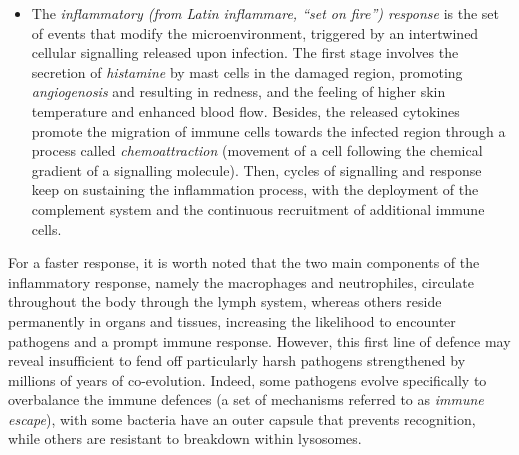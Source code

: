 \begin{itemize}
    Interferons interfere with  cells hosting virus, through mechanisms depending on their belonging class: $\alpha$, $\beta$ and $\gamma$. Interferons are released by virus-infected cells and by binding to neighbouring immune cells, they inhibit viral replication or promote the phagocytic ability of macrophages.

    Cytokines can be released by macrophages, dendritic cells, and natural killer cells. While some of them, such as interleukin-1 (IL-1) and tumour necrosis factor alpha (TNF-alpha), promote inflammation by recruiting neutrophils to the site of infection, others, on the contrary, such as interleukin-10 (IL-10) and transforming growth factor beta (TGF-beta) resolve inflammation and promote tissue repair.  
    
    \item The \textit{inflammatory (from Latin \textit{inflammare}, \enquote{set on fire}) response} is the set of events that modify the microenvironment, triggered by an intertwined cellular signalling released upon infection. The first stage involves the secretion of \textit{histamine} by mast cells in the damaged region, promoting \textit{angiogenosis} and resulting in redness, and the feeling of higher skin temperature and enhanced blood flow. Besides, the released cytokines promote the migration of immune cells towards the infected region through a process called \textit{chemoattraction} (movement of a cell following the chemical gradient of a signalling molecule). Then, cycles of signalling and response keep on sustaining the inflammation process, with the deployment of the complement system and the continuous recruitment of additional immune cells. 

\end{itemize}

For a faster response, it is worth noted that the two main components of the inflammatory response, namely the macrophages and neutrophiles, circulate throughout the body through the lymph system, whereas others reside permanently in organs and tissues, increasing the likelihood to encounter pathogens and a prompt immune response. However, this first line of defence may reveal insufficient to fend off particularly harsh pathogens strengthened by millions of years of co-evolution. Indeed, some pathogens evolve specifically to overbalance the immune defences (a set of mechanisms referred to as \textit{immune escape}), with some bacteria have an outer capsule that prevents recognition, while others are resistant to breakdown within lysosomes. 


